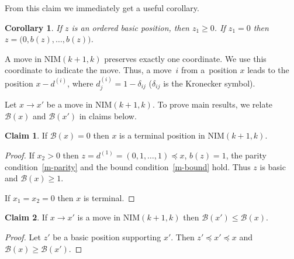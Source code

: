 \documentclass{article}
\newtheorem{corollary}{Corollary}
\theoremstyle{definition}
\newtheorem{claim}{Claim}
\def\mv#1{d^{(#1)}}
\def\B{\mathcal{B}}
\begin{document}
From this claim we immediately get a useful corollary.

\begin{corollary}\label{z1-fact}
  If  $z$ is an ordered basic position, then $z_1\geq0$. If $z_1=0$ then $z=\big(0, b(z),\dots, b(z)\big)$.
\end{corollary}

A move in NIM$(k+1,k)$ preserves exactly one coordinate. We use this coordinate to indicate the move. Thus, a move~$i$ from a~position $x$ leads to the position $x-\mv{i}$, where $\mv{i}_j = 1-\delta_{ij}$ ($\delta_{ij} $ is the Kronecker symbol). 

Let $x\to x'$ be a move in NIM$(k+1,k)$. To prove main results, we relate  $\B(x)$ and $\B(x')$ in  claims below.  

\begin{claim}\label{terminal}
  If $\B(x)=0$ then $x$ is a terminal position in \textup{NIM}$(k+1,k)$.
\end{claim}
\begin{proof}
  If $x_2>0$ then $z=\mv{1}=(0,1,\dots,1)\preceq x$, $b(z)=1$, the parity condition~\eqref{m-parity} and the bound condition~\eqref{m-bound} hold. Thus $z$ is basic and $\B(x)\geq 1$.

  If $x_1=x_2=0$ then $x$ is terminal.
\end{proof}


\begin{claim}\label{Bnonincrease}
  If $x\to x'$ is a move in \textup{NIM}$(k+1,k)$ then $\B(x')\leq \B(x)$.
\end{claim}
\begin{proof}
  Let $z'$ be a basic position supporting $x'$. Then $z'\preceq x'\preceq x$ and $\B(x)\geq \B(x')$.
\end{proof}
\end{document}
